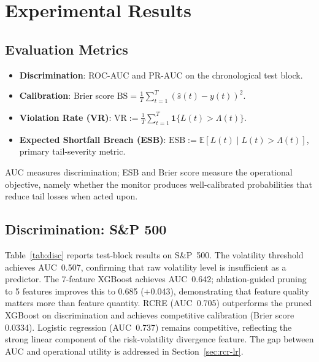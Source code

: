 \documentclass[sigconf]{acmart}
\begin{document}
\section{Experimental Results}
\label{sec:results}

\subsection{Evaluation Metrics}

\begin{itemize}[leftmargin=*]
\item \textbf{Discrimination}: ROC-AUC and PR-AUC on the chronological test block.
\item \textbf{Calibration}: Brier score $\text{BS} = \frac{1}{T}\sum_{t=1}^T (\hat{s}(t) - y(t))^2$.
\item \textbf{Violation Rate (VR)}: $\text{VR} := \frac{1}{T}\sum_{t=1}^T \mathbf{1}\{L(t) > \Lambda(t)\}$.
\item \textbf{Expected Shortfall Breach (ESB)}: $\text{ESB} := \mathbb{E}[L(t) \mid L(t) > \Lambda(t)]$, primary tail-severity metric.
\end{itemize}
AUC measures discrimination; ESB and Brier score measure the operational objective, namely whether the monitor produces well-calibrated probabilities that reduce tail losses when acted upon.

\subsection{Discrimination: S\&P 500}

Table~\ref{tab:disc} reports test-block results on S\&P~500. The volatility threshold achieves AUC~0.507, confirming that raw volatility level is insufficient as a predictor. The 7-feature XGBoost achieves AUC~0.642; ablation-guided pruning to 5 features improves this to 0.685 (+0.043), demonstrating that feature quality matters more than feature quantity. RCRE (AUC~0.705) outperforms the pruned XGBoost on discrimination and achieves competitive calibration (Brier score 0.0334). Logistic regression (AUC~0.737) remains competitive, reflecting the strong linear component of the risk-volatility divergence feature. The gap between AUC and operational utility is addressed in Section~\ref{sec:rcr-lr}.
\end{document}
